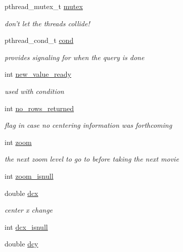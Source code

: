 \begin{DoxyCompactItemize}
\item 
pthread\-\_\-mutex\-\_\-t \hyperlink{structlspg__getcenter__struct_a214bb7e88b137162f13f41f2c43002a9}{mutex}
\begin{DoxyCompactList}\small\item\em don't let the threads collide! \end{DoxyCompactList}\item 
pthread\-\_\-cond\-\_\-t \hyperlink{structlspg__getcenter__struct_ae0db0ff2608ab5ba3e7c1b4ad3fc0e91}{cond}
\begin{DoxyCompactList}\small\item\em provides signaling for when the query is done \end{DoxyCompactList}\item 
int \hyperlink{structlspg__getcenter__struct_a4b350f11f1e375b9e9e839caaffbcb6b}{new\-\_\-value\-\_\-ready}
\begin{DoxyCompactList}\small\item\em used with condition \end{DoxyCompactList}\item 
int \hyperlink{structlspg__getcenter__struct_aaeb0ccf4289b4fb306c2bc04ae85b237}{no\-\_\-rows\-\_\-returned}
\begin{DoxyCompactList}\small\item\em flag in case no centering information was forthcoming \end{DoxyCompactList}\item 
int \hyperlink{structlspg__getcenter__struct_a63e640a925611d2404a1529aea30a853}{zoom}
\begin{DoxyCompactList}\small\item\em the next zoom level to go to before taking the next movie \end{DoxyCompactList}\item 
int \hyperlink{structlspg__getcenter__struct_a6ca85a8de29039188357b2814acd7803}{zoom\-\_\-isnull}
\item 
double \hyperlink{structlspg__getcenter__struct_ade0534056296e9ed568404c538be9227}{dcx}
\begin{DoxyCompactList}\small\item\em center x change \end{DoxyCompactList}\item 
int \hyperlink{structlspg__getcenter__struct_aa404da85af654998f039c81a77626748}{dcx\-\_\-isnull}
\item 
double \hyperlink{structlspg__getcenter__struct_a55b1a488b714e6a40d8e06a6e182bd0a}{dcy}

\end{DoxyCompactItemize}
